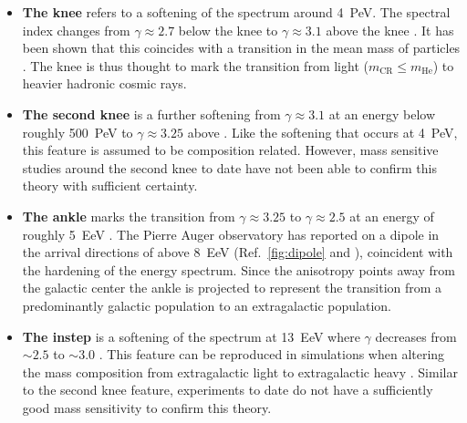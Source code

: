 \begin{itemize}
	\vspace{0.7cm}
	\item \textbf{The knee} refers to a softening of the spectrum around 
	\SI{4}{\peta\eV}. The spectral index changes from $\gamma\approx2.7$
	below the knee to $\gamma\approx3.1$ above the knee 
	\cite{blumerCosmicRaysKnee2009}. It has been shown that this coincides
	with a transition in the mean mass of \CR particles 
	\cite{lhaasocollaborationMeasurementsAllParticleEnergy2024}. The knee 
	is thus thought to mark the transition from light \CRs 
	($m_\mathrm{CR} \leq m_\mathrm{He}$) to heavier hadronic cosmic rays.

	\vspace{0.7cm}
	\item \textbf{The second knee} is a further softening from 
	$\gamma\approx3.1$ at an energy below roughly \SI{500}{\peta\eV} to 
	$\gamma\approx3.25$ above \cite{naganoEnergySpectrumPrimary1992, 
	lawrenceCosmicRayEnergy1991, birdEvidenceCorrelatedChanges1993, 
	abu-zayyadMeasurementCosmicRayEnergy2001}. Like the softening that 
	occurs at \SI{4}{\peta\eV}, this feature is assumed to be composition
	related. However, mass sensitive studies around the second knee to date
	have not been able to confirm this theory with sufficient certainty.

	\vspace{0.7cm}
	\item \textbf{The ankle} marks the transition from $\gamma\approx3.25$ 
	to $\gamma\approx2.5$ at an energy of roughly \SI{5}{\exa\eV} 
	\cite{fenuCosmicRayEnergy2023}. The Pierre Auger observatory has 
	reported on a dipole in the arrival directions of \CRs above 
	\SI{8}{\exa\eV} (Ref.\ \cref{fig:dipole} and 
	\cite{thepierreaugercollaborationObservationLargescaleAnisotropy2017}), 
	coincident with the hardening of the energy spectrum. Since the 
	anisotropy points away from the galactic center the ankle is projected
	to represent the transition from a predominantly galactic \CR 
	population to an extragalactic \CR population.

	\vspace{0.7cm}
	\item \textbf{The instep} is a softening of the \UHECR spectrum at 
	\SI{13}{\exa\eV} where $\gamma$ decreases from $\sim2.5$ to $\sim3.0$
	\cite{aabMeasurementCosmicrayEnergy2020}. This feature can be 
	reproduced in simulations when altering the \CR mass composition from 
	extragalactic light \CRs to extragalactic heavy \CRs 
	\cite{tsunesadaJointAnalysisEnergy2022}. Similar to the second knee 
	feature, experiments to date do not have a sufficiently good mass 
	sensitivity to confirm this theory.


\end{itemize}

